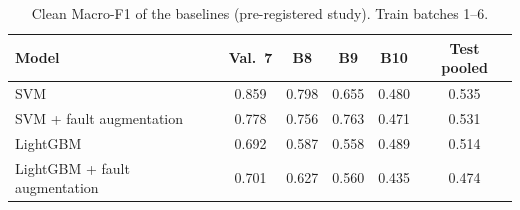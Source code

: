\begin{table}[t]
\centering
\footnotesize
\caption{Clean Macro-F1 of the baselines (pre-registered study). Train batches 1--6.}
\label{tab:v1clean}
\setlength{\tabcolsep}{3pt}
\begin{tabular}{lccccc}
\toprule
Model & Val.\ 7 & B8 & B9 & B10 & Test pooled \\
\midrule
SVM & 0.859 & 0.798 & 0.655 & 0.480 & 0.535 \\
SVM + fault augmentation & 0.778 & 0.756 & 0.763 & 0.471 & 0.531 \\
LightGBM & 0.692 & 0.587 & 0.558 & 0.489 & 0.514 \\
LightGBM + fault augmentation & 0.701 & 0.627 & 0.560 & 0.435 & 0.474 \\
\bottomrule
\end{tabular}
\end{table}
